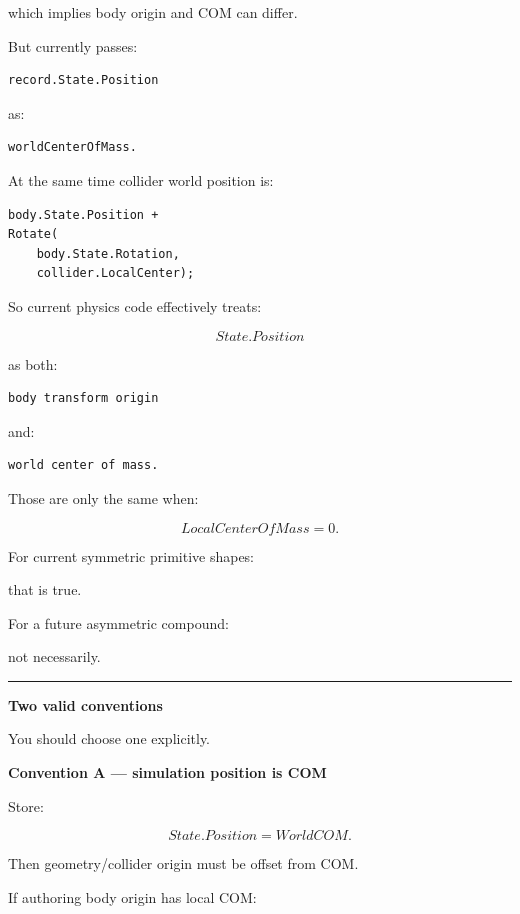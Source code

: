 which implies body origin and COM can differ.

But  currently passes:

\begin{verbatim}
record.State.Position
\end{verbatim}

as:

\begin{verbatim}
worldCenterOfMass.
\end{verbatim}

At the same time collider world position is:

\begin{verbatim}
body.State.Position +
Rotate(
    body.State.Rotation,
    collider.LocalCenter);
\end{verbatim}

So current physics code effectively treats:

\[
State.Position
\]

as both:

\begin{verbatim}
body transform origin
\end{verbatim}

and:

\begin{verbatim}
world center of mass.
\end{verbatim}

Those are only the same when:

\[
LocalCenterOfMass=0.
\]

For current symmetric primitive shapes:

that is true.

For a future asymmetric compound:

not necessarily.

\begin{center}\rule{0.5\linewidth}{0.5pt}\end{center}

\textbf{Two valid conventions}

You should choose one explicitly.

\textbf{Convention A --- simulation position is COM}

Store:

\[
State.Position
=
WorldCOM.
\]

Then geometry/collider origin must be offset from COM.

If authoring body origin has local COM:

